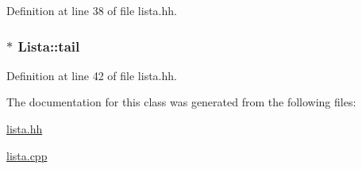 Definition at line 38 of file lista.\-hh.

\hypertarget{class_lista_a7d42e5f99e945d97c29d6f764f71f4e7}{
\subsubsection[{tail}]{$\ast$ Lista\-::tail\hspace{0.3cm}{\ttfamily [private]}}}\label{class_lista_a7d42e5f99e945d97c29d6f764f71f4e7}


Definition at line 42 of file lista.\-hh.



The documentation for this class was generated from the following files\-:\begin{DoxyCompactItemize}
\item 
\hyperlink{lista_8hh}{lista.\-hh}\item 
\hyperlink{lista_8cpp}{lista.\-cpp}\end{DoxyCompactItemize}
